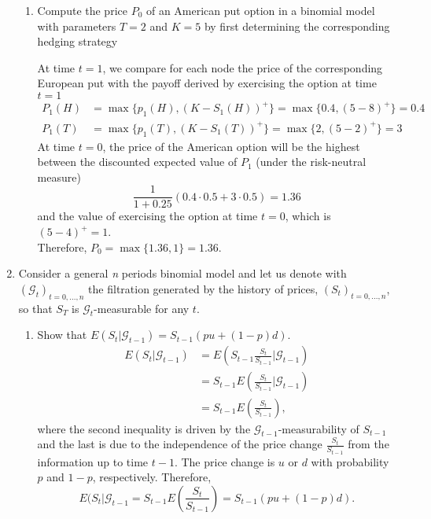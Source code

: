 \documentclass[handout,8pt]{beamer}
\begin{document}
\begin{frame}[allowframebreaks]{ }
\begin{enumerate}
\begin{enumerate}
        \item Compute the price $P_0$ of an American put option in a binomial model with parameters $T=2$ and $K=5$ by first determining the corresponding hedging strategy \newline
        
        At time $t=1$, we compare for each node the price of the corresponding European put with the payoff derived by exercising the option at time $t=1$
        \begin{align*}
            P_1(H) &= \max\{p_1(H), (K-S_1(H))^+\} = \max\{0.4,(5-8)^+\}=0.4\\
            P_1(T) &= \max\{p_1(T), (K-S_1(T))^+\} = \max\{2,(5-2)^+\}=3
        \end{align*}
        At time $t=0$, the price of the American option will be the highest between the discounted expected value of $P_1$ (under the risk-neutral measure)
        \begin{equation*}
            \frac{1}{1+0.25}(0.4\cdot 0.5 + 3\cdot 0.5) = 1.36
        \end{equation*}
        and the value of exercising the option at time $t=0$, which is $(5-4)^+=1$. \\
        Therefore, $P_0 = \max\{1.36,1\}=1.36$.
    \end{enumerate}
    
    \newpage
    
    \item Consider a general \textit{n} periods binomial model and let us denote with $(\mathcal{G}_t)_{t=0,...,n}$ the filtration generated by the history of prices, $(S_t)_{t=0,...,n}$, so that $S_T$ is $\mathcal{G}_t$-measurable for any $t$.
    
    \begin{enumerate}
        \item Show that $E(S_t|\mathcal{G}_{t-1})=S_{t-1}(pu+(1-p)d)$.
        \begin{align*}
            E(S_t|\mathcal{G}_{t-1}) &= E\left(S_{t-1}\frac{S_t}{S_{t-1}} \bigg\vert\mathcal{G}_{t-1}\right)\\
            &=S_{t-1}E\left(\frac{S_t}{S_{t-1}} \bigg\vert\mathcal{G}_{t-1} \right)\\
            &=S_{t-1}E\left(\frac{S_t}{S_{t-1}}\right),
        \end{align*}
        where the second inequality is driven by the $\mathcal{G}_{t-1}$-measurability of $S_{t-1}$ and the last is due to the independence of the price change $\frac{S_t}{S_{t-1}}$ from the information up to time $t-1$. The price change is $u$ or $d$ with probability $p$ and $1-p$, respectively. Therefore,
        \begin{equation*}
            E(S_t|\mathcal{G}_{t-1} = S_{t-1}E\left(\frac{S_t}{S_{t-1}}\right) = S_{t-1}(pu+(1-p)d).
        \end{equation*}
        

\end{enumerate}
\end{enumerate}
\end{frame}
\end{document}
